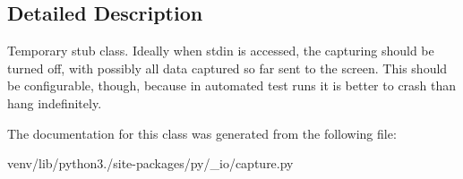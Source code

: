 \subsection{Detailed Description}
\begin{DoxyVerb}Temporary stub class.  Ideally when stdin is accessed, the
capturing should be turned off, with possibly all data captured
so far sent to the screen.  This should be configurable, though,
because in automated test runs it is better to crash than
hang indefinitely.
\end{DoxyVerb}
 

The documentation for this class was generated from the following file\+:\begin{DoxyCompactItemize}
\item 
venv/lib/python3./site-\/packages/py/\+\_\+io/capture.\+py\end{DoxyCompactItemize}

